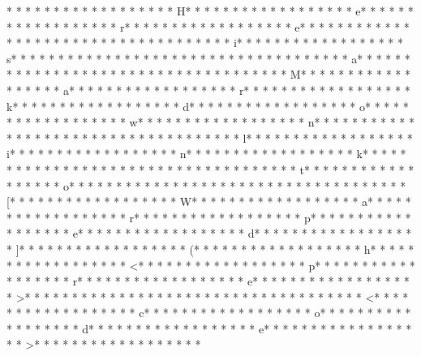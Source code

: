 * * *  * * *  * * *  *  * * *  *  * * *  * H* * *  * * *  * * *  *  * * *  *  * * *  * e* * *  * * *  * * *  *  * * *  *  * * *  * r* * *  * * *  * * *  *  * * *  *  * * *  * e* * *  * * *  * * *  *  * * *  *  * * *  *  * * *  * * *  * * *  *  * * *  *  * * *  * i* * *  * * *  * * *  *  * * *  *  * * *  * s* * *  * * *  * * *  *  * * *  *  * * *  *  * * *  * * *  * * *  *  * * *  *  * * *  * a* * *  * * *  * * *  *  * * *  *  * * *  *  * * *  * * *  * * *  *  * * *  *  * * *  * M* * *  * * *  * * *  *  * * *  *  * * *  * a* * *  * * *  * * *  *  * * *  *  * * *  * r* * *  * * *  * * *  *  * * *  *  * * *  * k* * *  * * *  * * *  *  * * *  *  * * *  * d* * *  * * *  * * *  *  * * *  *  * * *  * o* * *  * * *  * * *  *  * * *  *  * * *  * w* * *  * * *  * * *  *  * * *  *  * * *  * n* * *  * * *  * * *  *  * * *  *  * * *  *  * * *  * * *  * * *  *  * * *  *  * * *  * l* * *  * * *  * * *  *  * * *  *  * * *  * i* * *  * * *  * * *  *  * * *  *  * * *  * n* * *  * * *  * * *  *  * * *  *  * * *  * k* * *  * * *  * * *  *  * * *  *  * * *  *  * * *  * * *  * * *  *  * * *  *  * * *  * t* * *  * * *  * * *  *  * * *  *  * * *  * o* * *  * * *  * * *  *  * * *  *  * * *  *  * * *  * * *  * * *  *  * * *  *  * * *  * [* * *  * * *  * * *  *  * * *  *  * * *  * W* * *  * * *  * * *  *  * * *  *  * * *  * a* * *  * * *  * * *  *  * * *  *  * * *  * r* * *  * * *  * * *  *  * * *  *  * * *  * p* * *  * * *  * * *  *  * * *  *  * * *  * e* * *  * * *  * * *  *  * * *  *  * * *  * d* * *  * * *  * * *  *  * * *  *  * * *  * ]* * *  * * *  * * *  *  * * *  *  * * *  * (* * *  * * *  * * *  *  * * *  *  * * *  * h* * *  * * *  * * *  *  * * *  *  * * *  * <* * *  * * *  * * *  *  * * *  *  * * *  * p* * *  * * *  * * *  *  * * *  *  * * *  * r* * *  * * *  * * *  *  * * *  *  * * *  * e* * *  * * *  * * *  *  * * *  *  * * *  * >* * *  * * *  * * *  *  * * *  *  * * *  * 
* * *  * * *  * * *  *  * * *  *  * * *  * <* * *  * * *  * * *  *  * * *  *  * * *  * c* * *  * * *  * * *  *  * * *  *  * * *  * o* * *  * * *  * * *  *  * * *  *  * * *  * d* * *  * * *  * * *  *  * * *  *  * * *  * e* * *  * * *  * * *  *  * * *  *  * * *  * >* * *  * * *  * * *  *  * * *  *  * * *  * 
